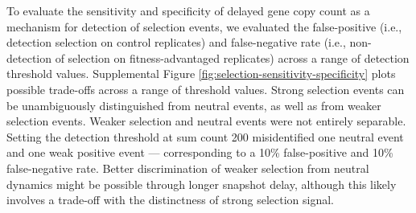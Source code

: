 To evaluate the sensitivity and specificity of delayed gene copy count as a mechanism for detection of selection events, we evaluated the false-positive (i.e., detection selection on control replicates) and false-negative rate (i.e., non-detection of selection on fitness-advantaged replicates) across a range of detection threshold values.
Supplemental Figure \ref{fig:selection-sensitivity-specificity} plots possible trade-offs across a range of threshold values.
Strong selection events can be unambiguously distinguished from neutral events, as well as from weaker selection events.
Weaker selection and neutral events were not entirely separable.
Setting the detection threshold at sum count 200 misidentified one neutral event and one weak positive event --- corresponding to a 10\% false-positive and 10\% false-negative rate.
Better discrimination of weaker selection from neutral dynamics might be possible through longer snapshot delay, although this likely involves a trade-off with the distinctness of strong selection signal.
